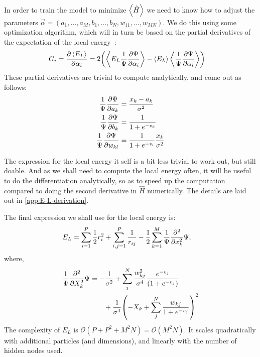 \documentclass[a4paper, 11pt]{article}
\begin{document}
\begin{multicols}{2}
    In order to train the model to minimize $\expval{\hat H}$ we need to know
    how to adjust the parameters $\vec\alpha = (a_1,\dots,a_M,
    b_1,\dots,b_N,w_{11},\dots,w_{MN})$. We do this using some optimization
    algorithm, which will in turn be based on the partial derivatives of the
    expectation of the local energy~\cite{mhj-compphys-II}:
    \begin{align}
            G_i &= \pdv{\expval{E_L}}{\alpha_i} 
            = 2\qty(\expval{E_L
        \frac{1}{\Psi}\pdv{\Psi}{\alpha_i}} -
        \expval{E_L}\expval{\frac{1}{\Psi}\pdv{\Psi}{\alpha_i}})
    \end{align}
    These partial derivatives are trivial to compute analytically, and come out as
    follows:
    \begin{align}
        \frac{1}{\Psi}\pdv{\Psi}{a_k} &=
        \frac{x_k-a_k}{\sigma^2}\label{eq:pdv-a}\\
        \frac{1}{\Psi}\pdv{\Psi}{b_k} &= \frac{1}{1 +
        e^{-v_k}}\label{eq:pdv-b}\\
        \frac{1}{\Psi}\pdv{\Psi}{w_{kl}} &= \frac{1}{1 +
        e^{-v_l}}\frac{x_k}{\sigma^2}
    \end{align}

    The expression for the local energy it self is a bit less trivial to work
    out, but still doable. And as we shall need to compute the local energy often,
    it will be useful to do the differentiation analytically, so as to speed up
    the computation compared to doing the second derivative in $\hat H$
    numerically. The details are laid out in \autoref{app:E-L-derivation}.

    The final expression we shall use for the local energy is:
    \begin{align}
        E_L &= \sum_{i=1}^P \frac{1}{2}r_i^2 + \sum_{i,j=1}^{P} \frac{1}{r_{ij}}
        - \frac{1}{2} \sum_{k=1}^M
        \frac{1}{\Psi}\pdv[2]{}{x_k}\Psi,\label{eq:E-L-final-main-section}
    \end{align}
    where,
    \begin{align}
        \begin{split}
        \frac{1}{\Psi}\pdv[2]{}{X_k}\Psi 
        &= -\frac{1}{\sigma^2} + \sum_j^N
        \frac{w_{kj}^2}{\sigma^4}
        \frac{e^{-v_j}}{\qty(1+e^{-v_j})} \\
        &\quad{   }\quad{      }  +
        \frac{1}{\sigma^4}\qty(-X_k+\sum_j^N \frac{w_{kj}}{1+e^{-v_j}})^2
        \end{split}
        \label{eq:E-L-second-deriv-main-section}
    \end{align}
    The complexity of $E_L$ is $\mathcal{O}(P + P^2 + M^2 N) = \mathcal{O}(M^2
    N)$. It scales quadratically with additional particles (and dimensions), and
    linearly with the number of hidden nodes used.



    \printbibliography

\end{multicols}
\end{document}
